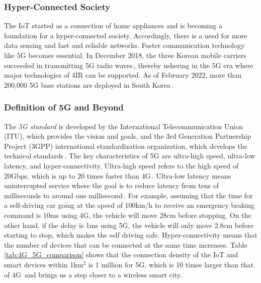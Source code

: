 \documentclass[11pt]{article}
\begin{document}
\subsubsection{Hyper-Connected Society}
The IoT started as a connection of home appliances and is becoming a foundation for a hyper-connected society. Accordingly, there is a need for more data sensing and fast and reliable networks. Faster communication technology like 5G becomes essential. In December 2018, the three Korean mobile carriers succeeded in transmitting 5G radio waves\,\cite{samsung2019}, thereby ushering in the 5G era where major technologies of 4IR can be supported. As of February 2022, more than 200,000 5G base stations are deployed in South Korea\,\cite{rcrwireless}.

\subsubsection{Definition of 5G and Beyond}
The \emph{5G standard} is developed by the International Telecommunication Union (ITU), which provides the vision and goals, and the 3rd Generation Partnership Project (3GPP) international standardization organization, which develops the technical standards\,\cite{samsung2018}. The key characteristics of 5G are ultra-high speed, ultra-low latency, and hyper-connectivity. Ultra-high speed refers to the high speed of 20Gbps, which is up to 20 times faster than 4G\,\cite{samsung2018}. Ultra-low latency means uninterrupted service where the goal is to reduce latency from tens of milliseconds to around one millisecond\,\cite{samsung2018}. For example, assuming that the time for a self-driving car going at the speed of 100km/h to receive an emergency braking command is 10ms using 4G, the vehicle will move 28cm before stopping. On the other hand, if the delay is 1ms using 5G, the vehicle will only move 2.8cm before starting to stop, which makes the self driving safe. Hyper-connectivity means that the number of devices that can be connected at the same time increases. Table \ref{tab:4G_5G_comparison} shows that the connection density of the IoT and smart devices within 1km$^2$ is 1 million for 5G, which is 10 times larger than that of 4G\,\cite{samsung2018} and brings us a step closer to a wireless smart city. 
\end{document}
